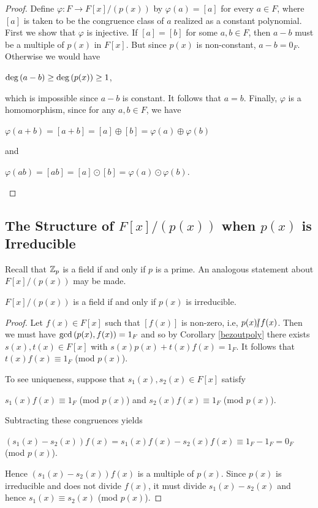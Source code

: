 \documentclass[11pt,fleqn,dvipsnames,usenames]{article}
\newcommand{\p}{\noindent}
\begin{document}
\begin{proof}
\p Define $\varphi:F\to F[x]/(p(x))$ by $\varphi(a) = [a]$ for every $a\in F$, where $[a]$ is taken to be the congruence class of $a$ realized as a constant polynomial.  First we show that $\varphi$ is injective.  If $[a] = [b]$ for some $a,b\in F$, then $a-b$ must be a multiple of $p(x)$ in $F[x]$.  But since $p(x)$ is non-constant, $a-b = 0_{F}$.  Otherwise we would have
\begin{center}
$\text{deg}\left(a - b\right) \geq \text{deg}\left(p(x)\right)\geq 1$,
\end{center}
which is impossible since $a-b$ is constant.  It follows that $a = b$.  Finally, $\varphi$ is a homomorphism, since for any $a,b\in F$, we have
\begin{center}
$\varphi(a+b) = [a+b] = [a]\oplus[b] = \varphi(a) \oplus \varphi(b)$
\end{center}
and
\begin{center}
$\varphi(ab) = [ab] = [a]\odot[b] = \varphi(a) \odot \varphi(b)$.
\end{center}
\end{proof}

\subsection{The Structure of $F[x]/(p(x))$ when $p(x)$ is Irreducible}

\p Recall that $\mathbb{Z}_p$ is a field if and only if $p$ is a prime.  An analogous statement about $F[x]/(p(x))$ may be made.
\vsp

\begin{theorem}
$F[x]/(p(x))$ is a field if and only if $p(x)$ is irreducible.
\end{theorem}
%
\begin{proof}
\p Let $f(x)\in F[x]$ such that $[f(x)]$ is non-zero, i.e, $p(x)|\kern-0.9ex{/} f(x)$.  Then we must have $\GCD{p(x),f(x)} = \nolinebreak 1_{F}$ and so by Corollary \ref{bezoutpoly} there exists $s(x),t(x)\in F[x]$ with $s(x)p(x) + t(x)f(x) = 1_{F}$.  It follows that $t(x)f(x)\equiv 1_{F}$ (mod $p(x)$).
\vsp

\p To see uniqueness, suppose that $s_{1}(x), s_{2}(x)\in F[x]$ satisfy 
\begin{center}
$s_{1}(x)f(x) \equiv 1_{F}$ (mod $p(x)$) and $s_{2}(x)f(x) \equiv 1_{F}$ (mod $p(x)$).
\end{center}
\p Subtracting these congruences yields
\begin{center}
$(s_{1}(x) - s_{2}(x))f(x) = s_{1}(x)f(x) - s_{2}(x)f(x)\equiv 1_{F} - 1_{F} = 0_{F}$ (mod $p(x)$).
\end{center}
\p Hence $(s_{1}(x) - s_{2}(x))f(x)$ is a multiple of $p(x)$.  Since $p(x)$ is irreducible and does not divide $f(x)$, it must divide $s_{1}(x) - s_{2}(x)$ and hence $s_{1}(x)\equiv s_{2}(x)$ (mod $p(x)$).
\end{proof}
\end{document}
